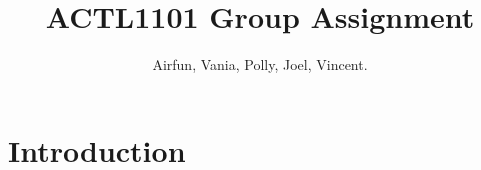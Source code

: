 \documentclass[12pt,a4paper,oneside,reqno]{article}
\title{ACTL1101 Group Assignment}
\author{Airfun, Vania, Polly, Joel, Vincent.}
\begin{document}
	\maketitle
	\section{Introduction}
	\lipsum
\end{document}
